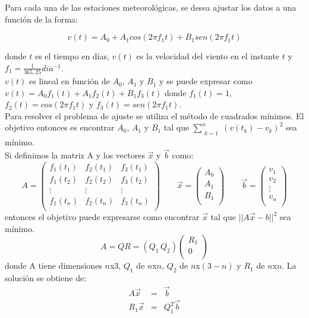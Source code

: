 \documentclass[journal, monochrome]{IEEEtran}
\begin{document}
\par
Para cada una de las estaciones meteorológicas, se desea ajustar los datos a una función de la forma:

\begin{equation}
v(t) = A_{0} + A_{1}cos(2\pi f_{1}t) + B_{1}sen(2\pi f_{1}t)
\label{equation:model}
\end{equation}

donde $t$ es el tiempo en días, $v(t)$ es la velocidad del viento en el instante $t$ y $f_{1} = \frac{1}{365,25} dia^{-1}$. \\
$v(t)$ es lineal en función de $A_{0}$, $A_{1}$ y $B_{1}$ y se puede expresar como $v(t) = A_{0}f_{1}(t) + A_{1}f_{2}(t) + B_{1}f_{3}(t)$ donde $f_{1}(t) = 1$, $f_{2}(t) = cos(2\pi f_{1}t)$ y $f_{3}(t) = sen(2\pi f_{1}t)$. \\
Para resolver el problema de ajuste se utiliza el método de cuadrados mínimos. El objetivo entonces es encontrar $A_{0}$, $A_{1}$ y $B_{1}$ tal que 
$\displaystyle\sum_{\substack{k=1}}^{n} (v(t_{k})- v_{k})^{2} $ sea mínimo. \\
Si definimos la matriz A y los vectores $\vec{x}$ y $\vec{b}$ como:
\begin{equation}
A = \left(\begin{array}{ccc}
f_{1}(t_{1}) & f_{2}(t_{1}) & f_{3}(t_{1}) \\
f_{1}(t_{2}) & f_{2}(t_{2}) & f_{3}(t_{2}) \\
\vdots & \vdots & \vdots \\
f_{1}(t_{n}) & f_{2}(t_{n}) & f_{3}(t_{n}) \\
\end{array} \right) \qquad
\vec{x} = \left(\begin{array}{c}
A_{0} \\
A_{1} \\
B_{1} \\
\end{array} \right) \qquad
\vec{b} = \left(\begin{array}{c}
v_{1} \\
v_{2} \\
\vdots \\
v_{n} \\
\end{array} \right)
\end{equation}
entonces el objetivo puede expresarse como encontrar $\vec{x}$ tal que $||A\vec{x} - {b}||^{2}$ sea mínimo. \\
\begin{equation}
A = QR = (Q_{1} \, Q_{2}) \left( \begin{array}{c}
R_{1} \\
0 \\
\end{array} \right)
\end{equation}
donde A tiene dimensiones $n$x$3$, $Q_{1}$ de $n$x$n$, $Q_{2}$ de $n$x$(3-n)$ y $R_{1}$ de $n$x$n$.
La solución se obtiene de:
\begin{eqnarray}
A\vec{x} & = & \vec{b} \\
R_{1}\vec{x} & = & Q_{1}^{T}\vec{b} 
\end{eqnarray}
\end{document}
